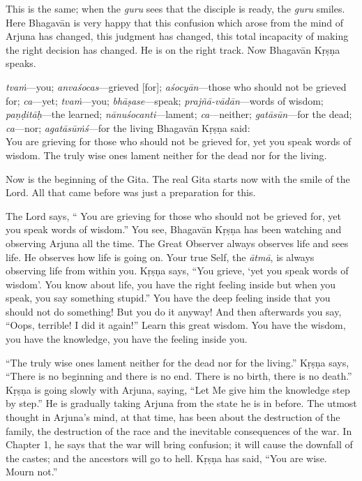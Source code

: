 This is the same; when the \textit{guru} sees that the disciple is ready, the \textit{guru} smiles. Here Bhagavān is very happy that this confusion which arose from the mind of Arjuna has changed, this judgment has changed, this total incapacity of making the right decision has changed. He is on the right track. Now Bhagavān Kṛṣṇa speaks.

{%
  \textit{tvaṁ}---you; 
  \textit{anvaśocas}---grieved [for]; 
  \textit{aśocyān}---those who should not be grieved for; 
  \textit{ca}---yet; 
  \textit{tvaṁ}---you; 
  \textit{bhāṣase}---speak; 
  \textit{prajñā-vādān}---words of wisdom; 
  \textit{paṇḍitāḥ}---the learned; 
  \textit{nānuśocanti}---lament; 
  \textit{ca}---neither; 
  \textit{gatāsūn}---for the dead; 
  \textit{ca}---nor; 
  \textit{agatāsūṁś}---for the living
}
{%
  \hspace*{1em}Bhagavān Kṛṣṇa said: \\
  You are grieving for those who should not be grieved for, yet you speak words of wisdom. The truly wise ones lament neither for the dead nor for the living.
}

Now is the beginning of the Gita. The real Gita starts now with the smile of the Lord. All that came before was just a preparation for this.

The Lord says, “ You are grieving for those who should not be grieved for, yet you speak words of wisdom.” You see, Bhagavān Kṛṣṇa has been watching and observing Arjuna all the time. The Great Observer always observes life and sees life. He observes how life is going on. Your true Self, the \textit{ātmā}, is always observing life from within you. Kṛṣṇa says, “You grieve, ‘yet you speak words of wisdom’. You know about life, you have the right feeling inside but when you speak, you say something stupid.” You have the deep feeling inside that you should not do something! But you do it anyway! And then afterwards you say, “Oops, terrible! I did it again!” Learn this great wisdom. You have the wisdom, you have the knowledge, you have the feeling inside you.

“The truly wise ones lament neither for the dead nor for the living.” Kṛṣṇa says, “There is no beginning and there is no end. There is no birth, there is no death.” Kṛṣṇa is going slowly with Arjuna, saying, “Let Me give him the knowledge step by step.” He is gradually taking Arjuna from the state he is in before. The utmost thought in Arjuna’s mind, at that time, has been about the destruction of the family, the destruction of the race and the inevitable consequences of the war. In Chapter 1, he says that the war will bring confusion; it will cause the downfall of the castes; and the ancestors will go to hell. Kṛṣṇa has said, “You are wise. Mourn not.” 

